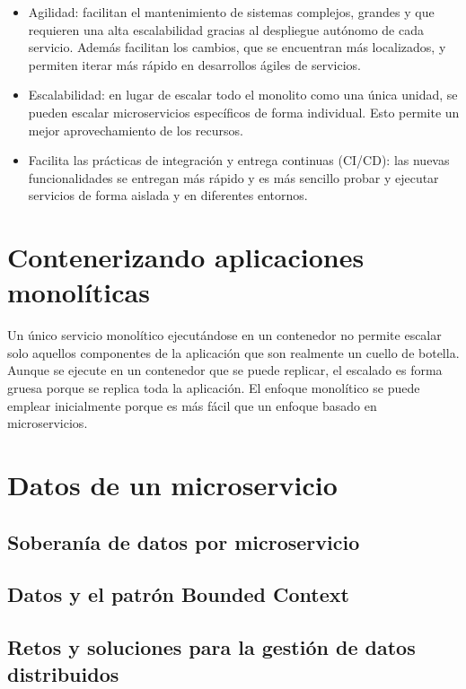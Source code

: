 \documentclass[11pt,a4paper]{article}
\begin{document}
\begin{itemize}

\item Agilidad: facilitan el mantenimiento de sistemas complejos, grandes y que requieren una alta escalabilidad gracias al despliegue autónomo de cada servicio. Además facilitan los cambios, que se encuentran más localizados, y permiten iterar más rápido en desarrollos ágiles de servicios.

\item Escalabilidad: en lugar de escalar todo el monolito como una única unidad, se pueden escalar microservicios específicos de forma individual. Esto permite un mejor aprovechamiento de los recursos.

\item Facilita las prácticas de integración y entrega continuas (CI/CD): las nuevas funcionalidades se entregan más rápido y es más sencillo probar y ejecutar servicios de forma aislada y en diferentes entornos.

\end{itemize}

\section{Contenerizando aplicaciones monolíticas}

Un único servicio monolítico ejecutándose en un contenedor no permite escalar solo aquellos componentes de la aplicación que son realmente un cuello de botella. Aunque se ejecute en un contenedor que se puede replicar, el escalado es forma gruesa porque se replica toda la aplicación. El enfoque monolítico se puede emplear inicialmente porque es más fácil que un enfoque basado en microservicios.

\section{Datos de un microservicio}

\subsection{Soberanía de datos por microservicio}

\subsection{Datos y el patrón Bounded Context}

\subsection{Retos y soluciones para la gestión de datos distribuidos}
\end{document}
